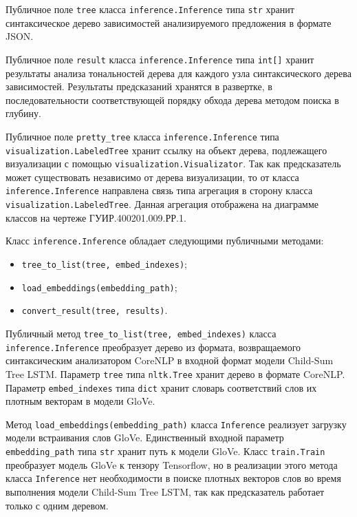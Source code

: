 Публичное поле \texttt{tree} класса \texttt{inference.Inference} типа \texttt{str} хранит синтаксическое дерево зависимостей анализируемого предложения в формате JSON\@.

Публичное поле \texttt{result} класса \texttt{inference.Inference} типа \texttt{int[]} хранит результаты анализа тональностей дерева для каждого узла синтаксического дерева зависимостей. Результаты предсказаний хранятся в развертке, в последовательности соответствующей порядку обхода дерева методом поиска в глубину.

Публичное поле \texttt{pretty\_tree} класса \texttt{inference.Inference} типа \texttt{visu\-alization.LabeledTree} хранит ссылку на объект дерева, подлежащего визуализации с помощью \texttt{visualization.Visualizator}. Так как предсказатель может существовать независимо от дерева визуализации, то от класса \texttt{infer\-ence.Inference} направлена связь типа агрегация в сторону класса \texttt{visuali\-zation.LabeledTree}. Данная агрегация отображена на диаграмме классов на чертеже ГУИР.400201.009.РР.1.

Класс \texttt{inference.Inference} обладает следующими публичными методами:
\begin{itemize}
\item \texttt{tree\_to\_list(tree, embed\_indexes)};
\item \texttt{load\_embeddings(embedding\_path)};
\item \texttt{convert\_result(tree, results)}.
\end{itemize}

Публичный метод \texttt{tree\_to\_list(tree, embed\_indexes)} класса \texttt{infe\-rence.Inference} преобразует дерево из формата, возвращаемого синтаксическим анализатором CoreNLP в входной формат модели Child-Sum Tree LSTM\@. Параметр \texttt{tree} типа \texttt{nltk.Tree} хранит дерево в формате CoreNLP\@. Параметр \texttt{embed\_indexes} типа \texttt{dict} хранит словарь соответствий слов их плотным векторам в модели GloVe.

Метод \texttt{load\_embeddings(embedding\_path)} класса \texttt{Inference} реализует загрузку модели встраивания слов GloVe. Единств\-енный входной параметр \texttt{embedding\_path} типа \texttt{str} хранит путь к модели GloVe. Класс \texttt{train.Train} преобразует модель GloVe к тензору Tensorflow, но в реализации этого метода класса \texttt{Inference} нет необходимости в поиске плотных векторов слов во время выполнения модели Child-Sum Tree LSTM, так как предсказатель работает только с одним деревом.

